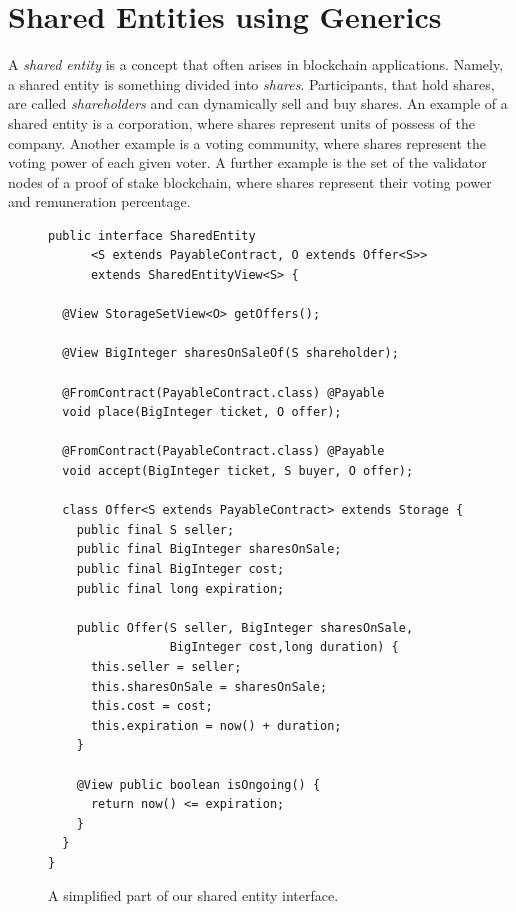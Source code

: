 \section{Shared Entities using Generics}\label{sec:shared_entities}

A \emph{shared entity} is a concept that often arises in blockchain
applications. Namely, a shared entity is something divided into \emph{shares}. Participants,
that hold shares, are called \emph{shareholders} and can dynamically
sell and buy shares. An example of a shared entity is a corporation,
where shares represent units of possess of the company. Another example is
a voting community, where shares represent the voting power of each given voter.
A further example is the set of the validator nodes of a proof of stake blockchain,
where shares represent their voting power and remuneration percentage.

\begin{figure}[ht]
  \begin{center}
    \begin{lstlisting}[language=Takamaka]
public interface SharedEntity
      <S extends PayableContract, O extends Offer<S>>
      extends SharedEntityView<S> {

  @View StorageSetView<O> getOffers();

  @View BigInteger sharesOnSaleOf(S shareholder);

  @FromContract(PayableContract.class) @Payable
  void place(BigInteger ticket, O offer);

  @FromContract(PayableContract.class) @Payable
  void accept(BigInteger ticket, S buyer, O offer);

  class Offer<S extends PayableContract> extends Storage {
    public final S seller;
    public final BigInteger sharesOnSale;
    public final BigInteger cost;
    public final long expiration;

    public Offer(S seller, BigInteger sharesOnSale, 
                 BigInteger cost,long duration) {
      this.seller = seller;
      this.sharesOnSale = sharesOnSale;
      this.cost = cost;
      this.expiration = now() + duration;
    }

    @View public boolean isOngoing() {
      return now() <= expiration;
    }
  }
}
    \end{lstlisting}
  \end{center}
  \caption{A simplified part of our shared entity interface.}\label{fig:shared_entity}
\end{figure}

